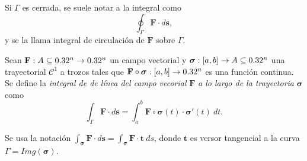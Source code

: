 \begin{definition}
    Si $\Gamma$  es cerrada,  se suele notar a la integral como
    \[
        \oint_{\Gamma}\mathbf{F}\cdot d\mathbf{s},  
    \]  y se la llama integral de circulaci\'on de $\mathbf{F}$ sobre $\Gamma$.
\end{definition}

\begin{definition}
    Sean $\mathbf{F}:A\subseteq0.32^n\to0.32^n$ un campo vectorial y $\boldsymbol{\sigma}:[a,b]\to A\subseteq0.32^n$ una trayectorial $\mathcal{C}^1$ a trozos tales que $\mathbf{F}\circ\boldsymbol{\sigma}:[a,b]\to0.32^n$ es una funci\'on continua. Se define la \emph{integral de de l\'inea del campo vecorial} $\mathbf{F}$ \emph{a lo largo de la trayectoria} $\boldsymbol{\sigma}$ como
    \[
        \int_{\Gamma}\mathbf{F}\cdot d\mathbf{s}=\int_a^b\mathbf{F}\circ\boldsymbol{\sigma}(t)\cdot\boldsymbol{\sigma}'(t)\:dt. 
    \]
\end{definition}

Se usa la notaci\'on $\int_{\boldsymbol{\sigma}}\mathbf{F}\cdot d\mathbf{s}=\int_{\boldsymbol{\sigma}}\mathbf{F}\cdot{\mathbf{t}}\:ds$,  donde ${\mathbf{t}}$ es versor tangencial a la curva  $\Gamma = Img(\boldsymbol{\sigma}).$
